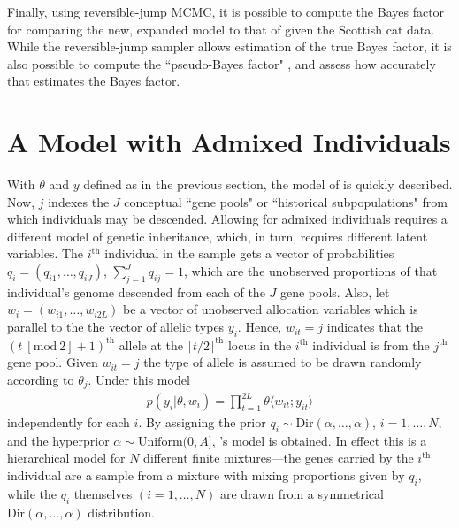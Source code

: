 \documentclass[11pt]{article}
\newcommand{\Dir}{\mathrm{Dir}}
\newcommand{\ceil}[1]{\lceil #1 \rceil}
\newcommand{\thh}{^\mathrm{th}}
\newcommand{\modtwo}{\mathrm{[mod~2]}}
\newcommand{\thetaof}[2]{\theta \langle #1;#2\rangle}
\begin{document}
Finally, using reversible-jump MCMC, it is possible to compute the Bayes factor for
comparing the new, expanded model to that of  given the Scottish
cat data.  While the reversible-jump sampler allows  estimation of the true Bayes factor, 
it is also possible to compute the ``pseudo-Bayes factor" \cite{Gelfandetal1992}, and assess how
accurately that estimates the Bayes factor.




\section{A Model with Admixed Individuals}
\label{sec:Adm}
With $\theta$ and $y$ defined as in the previous section, the model of
 is quickly described.   Now, $j$ indexes the $J$
conceptual ``gene pools" or ``historical subpopulations" from which
individuals may be descended.  Allowing for admixed individuals requires
a different model of genetic inheritance, which, in turn, requires
different latent variables.  The $i\thh$ individual in the
sample gets  a vector of probabilities $q_i = (q_{i1},\ldots,q_{iJ})$, 
$\sum_{j=1}^J q_{ij} = 1$, which are the unobserved proportions of that
individual's genome descended from each of the $J$ gene pools. 
Also, let
$w_i = (w_{i1},\ldots,w_{i2L})$ be a vector of unobserved allocation
variables which is parallel to the the vector of allelic types
$y_i$.  Hence, $w_{it}=j$  indicates that the $(t~\modtwo +1)\thh$
allele at the $\ceil{t/2}\thh$ locus in the $i\thh$ individual is from
the $j\thh$ gene pool.   Given $w_{it} = j$ the type of allele is assumed
to be drawn randomly according to $\theta_j$.  Under this model
\begin{eqnarray}
p(y_i|\theta,w_i) = \prod_{t=1}^{2L} \thetaof{w_{it}}{y_{it}}
\end{eqnarray}
independently for each $i$.
By assigning the prior $q_i\sim\Dir(\alpha,\ldots,\alpha)$,  
$i=1,\ldots,N$, and the hyperprior $\alpha \sim \mathrm{Uniform}(0,A]$,
's model is obtained.  In effect this is a 
hierarchical model for $N$ different finite mixtures---the genes carried
by the $i\thh$ individual are a sample from a mixture with mixing proportions 
given by $q_i$, while the $q_i$ themselves $(i=1,\ldots,N)$ are drawn from
a symmetrical $\Dir(\alpha,\ldots,\alpha)$ distribution.
\end{document}
